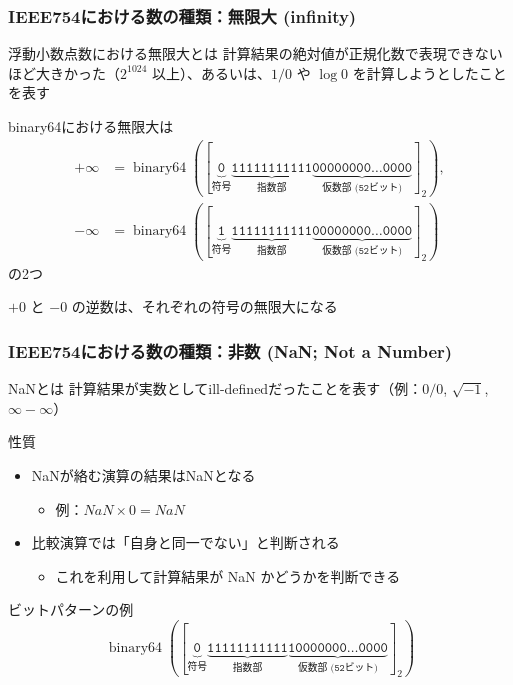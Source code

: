 \documentclass[aspectratio=169]{beamer}
\begin{document}
\begin{frame}\frametitle{IEEE754における数の種類：無限大 (infinity)}
  \begin{block}{浮動小数点数における無限大とは}
    計算結果の絶対値が正規化数で表現できないほど大きかった（\(2^{1024}\) 以上）、あるいは、\(1/0\) や \(\log 0\) を計算しようとしたことを表す
  \end{block}

  binary64における無限大は
  \begin{align*}
    +\infty&=\operatorname{binary64}(
             [\mathtt{
             \underbrace{0}_{符号}
             \underbrace{111 1111 1111}_{\text{指数部}}
             \underbrace{0000 0000 \dotsc 0000}_{\text{仮数部 (52ビット)}}
             }]_2
             ), \\
    -\infty&=\operatorname{binary64}(
             [\mathtt{
             \underbrace{1}_{符号}
             \underbrace{111 1111 1111}_{\text{指数部}}
             \underbrace{0000 0000 \dotsc 0000}_{\text{仮数部 (52ビット)}}
             }]_2
             )
  \end{align*}
  の2つ

  \(+0\) と \(-0\) の逆数は、それぞれの符号の無限大になる
\end{frame}

\begin{frame}\frametitle{IEEE754における数の種類：非数 (NaN; Not a Number)}
  \begin{block}{NaNとは}
    計算結果が実数としてill-definedだったことを表す（例：\(0/0\), \(\sqrt{-1}\), \(\infty-\infty\)）
  \end{block}

  \begin{block}{性質}
    \begin{itemize}
    \item NaNが絡む演算の結果はNaNとなる
      \begin{itemize}
      \item 例：\(NaN\times 0=NaN\)
      \end{itemize}
    \item 比較演算では「自身と同一でない」と判断される
      \begin{itemize}
      \item これを利用して計算結果が NaN かどうかを判断できる
      \end{itemize}
    \end{itemize}
  \end{block}

  \begin{exampleblock}{ビットパターンの例}
    \[\operatorname{binary64}(
    [\mathtt{
      \underbrace{0}_{符号}
      \underbrace{111 1111 1111}_{\text{指数部}}
      \underbrace{1000 0000 \dotsc 0000}_{\text{仮数部 (52ビット)}}
    }]_2
    )\]
  \end{exampleblock}
\end{frame}
\end{document}

